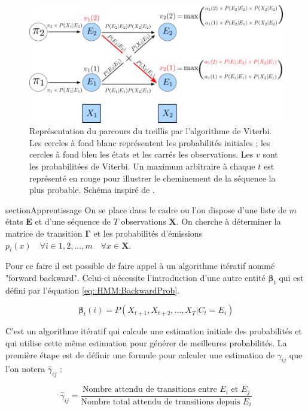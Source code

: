 \documentclass[12pt]{report}
\begin{document}
		\begin{figure}[ht]
			\begin{center}
				\includegraphics[width= 0.8 \textwidth]{Images/Models/HMM/Viterbi.png}
				\caption{Représentation du parcours du treillis par l'algorithme de Viterbi. Les cercles à fond blanc représentent les probabilités initiales ; les cercles à fond bleu les états et les carrés les observations. Les $v$ sont les probabilitées de Viterbi. Un maximum arbitraire à chaque $t$ est représenté en rouge pour illustrer le cheminement de la séquence la plus probable. Schéma inspiré de \cite{jurafsky_speech_2017}.}
				\label{fig::HMM:ViterbiAlgo}
				\end{center}
				\end{figure}
				
				section{Apprentissage}
				\label{subsubsec:Models_HMM_Apprentissage}
				On se place dans le cadre ou l'on dispose d'une liste de $m$ états $\bm{E}$ et d'une séquence de $T$ observations $\bm{X}$. On cherche à déterminer la matrice de transition $\bm{\Gamma}$ et les probabilités d'émissions $p_i(x) \quad \forall i\in 1,2,...,m \quad \forall x \in \bm{X}$.
				
				Pour ce faire il est possible de faire appel à un algorithme itératif nommé "forward backward". Celui-ci nécessite l'introduction d'une autre entité $\bm{\beta}_t$ qui est défini par l'équation \eqref{eq::HMM:BackwardProb}.
				
				\begin{equation}
				\bm{\beta}_t(i) = P(X_{t+1},X_{t+2},...,X_{T}|C_t=E_i)
				\label{eq::HMM:BackwardProb}
				\end{equation}
				
				C'est un algorithme itératif qui calcule une estimation initiale des probabilités et qui utilise cette même estimation pour générer de meilleures probabilités. La première étape est de définir une formule pour calculer une estimation de $\gamma_{ij}$ que l'on notera $\hat{\gamma}_{ij}$ :
				
				\begin{equation}
				\hat{\gamma}_{ij} = \frac{\text{Nombre attendu de transitions entre } E_i \text{ et } E_j}{\text{Nombre total attendu de transitions depuis }E_i}
				\end{equation}
				
\end{document}
